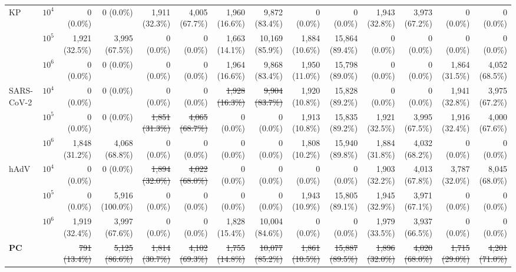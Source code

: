 \begin{table}[htbp]
\begin{tabular}{@{}llrrrrrrrrrrrr@{}}
    \midrule
    \multirow{3}{*}{KP} & $10^4$ & 0 (0.0\%) & 0 (0.0\%) & 1,911 (32.3\%) & 4,005 (67.7\%) & 1,960 (16.6\%) & 9,872 (83.4\%) & 0 (0.0\%) & 0 (0.0\%) & 1,943 (32.8\%) & 3,973 (67.2\%) & 0 (0.0\%) & 0 (0.0\%) \\
     & $10^5$ & 1,921 (32.5\%) & 3,995 (67.5\%) & 0 (0.0\%) & 0 (0.0\%) & 1,663 (14.1\%) & 10,169 (85.9\%) & 1,884 (10.6\%) & 15,864 (89.4\%) & 0 (0.0\%) & 0 (0.0\%) & 0 (0.0\%) & 0 (0.0\%) \\
     & $10^6$ & 0 (0.0\%) & 0 (0.0\%) & 0 (0.0\%) & 0 (0.0\%) & 1,964 (16.6\%) & 9,868 (83.4\%) & 1,950 (11.0\%) & 15,798 (89.0\%) & 0 (0.0\%) & 0 (0.0\%) & 1,864 (31.5\%) & 4,052 (68.5\%) \\
    \midrule
    \multirow{3}{*}{SARS-CoV-2} & $10^4$ & 0 (0.0\%) & 0 (0.0\%) & 0 (0.0\%) & 0 (0.0\%) & \sout{1,928 (16.3\%)} & \sout{9,904 (83.7\%)} & 1,920 (10.8\%) & 15,828 (89.2\%) & 0 (0.0\%) & 0 (0.0\%) & 1,941 (32.8\%) & 3,975 (67.2\%) \\
     & $10^5$ & 0 (0.0\%) & 0 (0.0\%) & \sout{1,851 (31.3\%)} & \sout{4,065 (68.7\%)} & 0 (0.0\%) & 0 (0.0\%) & 1,913 (10.8\%) & 15,835 (89.2\%) & 1,921 (32.5\%) & 3,995 (67.5\%) & 1,916 (32.4\%) & 4,000 (67.6\%) \\
     & $10^6$ & 1,848 (31.2\%) & 4,068 (68.8\%) & 0 (0.0\%) & 0 (0.0\%) & 0 (0.0\%) & 0 (0.0\%) & 1,808 (10.2\%) & 15,940 (89.8\%) & 1,884 (31.8\%) & 4,032 (68.2\%) & 0 (0.0\%) & 0 (0.0\%) \\
    \midrule
    \multirow{3}{*}{hAdV} & $10^4$ & 0 (0.0\%) & 0 (0.0\%) & \sout{1,894 (32.0\%)} & \sout{4,022 (68.0\%)} & 0 (0.0\%) & 0 (0.0\%) & 0 (0.0\%) & 0 (0.0\%) & 1,903 (32.2\%) & 4,013 (67.8\%) & 3,787 (32.0\%) & 8,045 (68.0\%) \\
     & $10^5$ & 0 (0.0\%) & 5,916 (100.0\%) & 0 (0.0\%) & 0 (0.0\%) & 0 (0.0\%) & 0 (0.0\%) & 1,943 (10.9\%) & 15,805 (89.1\%) & 1,945 (32.9\%) & 3,971 (67.1\%) & 0 (0.0\%) & 0 (0.0\%) \\
     & $10^6$ & 1,919 (32.4\%) & 3,997 (67.6\%) & 0 (0.0\%) & 0 (0.0\%) & 1,828 (15.4\%) & 10,004 (84.6\%) & 0 (0.0\%) & 0 (0.0\%) & 1,979 (33.5\%) & 3,937 (66.5\%) & 0 (0.0\%) & 0 (0.0\%) \\
    \midrule
    \multicolumn{2}{l}{\textbf{PC}} & \sout{791 (13.4\%)} & \sout{5,125 (86.6\%)} & \sout{1,814 (30.7\%)} & \sout{4,102 (69.3\%)} & \sout{1,755 (14.8\%)} & \sout{10,077 (85.2\%)} & \sout{1,861 (10.5\%)} & \sout{15,887 (89.5\%)} & \sout{1,896 (32.0\%)} & \sout{4,020 (68.0\%)} & \sout{1,715 (29.0\%)} & \sout{4,201 (71.0\%)} \\

\end{tabular}
\end{table}
